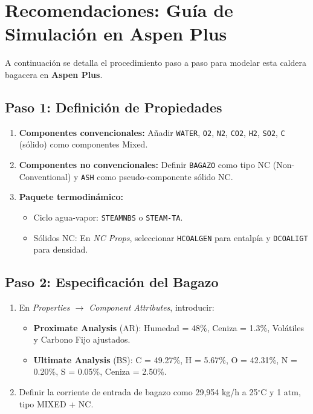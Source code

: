 \section{Recomendaciones: Guía de Simulación en Aspen Plus}

A continuación se detalla el procedimiento paso a paso para modelar esta caldera bagacera en \textbf{Aspen Plus}.

\subsection{Paso 1: Definición de Propiedades}
\begin{enumerate}
	\item \textbf{Componentes convencionales:} Añadir \texttt{WATER}, \texttt{O2}, \texttt{N2}, \texttt{CO2}, \texttt{H2}, \texttt{SO2}, \texttt{C} (sólido) como componentes Mixed.
	\item \textbf{Componentes no convencionales:} Definir \texttt{BAGAZO} como tipo NC (Non-Conventional) y \texttt{ASH} como pseudo-componente sólido NC.
	\item \textbf{Paquete termodinámico:}
	\begin{itemize}
		\item Ciclo agua-vapor: \texttt{STEAMNBS} o \texttt{STEAM-TA}.
		\item Sólidos NC: En \textit{NC Props}, seleccionar \texttt{HCOALGEN} para entalpía y \texttt{DCOALIGT} para densidad.
	\end{itemize}
\end{enumerate}

\subsection{Paso 2: Especificación del Bagazo}
\begin{enumerate}
	\item En \textit{Properties $\rightarrow$ Component Attributes}, introducir:
	\begin{itemize}
		\item \textbf{Proximate Analysis} (AR): Humedad = 48\%, Ceniza = 1.3\%, Volátiles y Carbono Fijo ajustados.
		\item \textbf{Ultimate Analysis} (BS): C = 49.27\%, H = 5.67\%, O = 42.31\%, N = 0.20\%, S = 0.05\%, Ceniza = 2.50\%.
	\end{itemize}
	\item Definir la corriente de entrada de bagazo como 29{,}954 kg/h a 25$^{\circ}$C y 1 atm, tipo MIXED + NC.
\end{enumerate}

